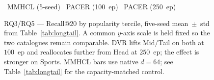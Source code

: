 \documentclass[conference]{IEEEtran}
\newcommand{\dvr}{DVR\xspace}
\begin{document}
\begin{figure}[!htbp]
\vspace{0.4mm}
{\scriptsize
{}~MMHCL (5-seed)\quad
{}~PACER (100~ep)\quad
{}~PACER (250~ep)}
\caption{RQ3/RQ5 --- Recall@20 by popularity tercile, five-seed
mean~$\pm$~std from Table~\ref{tab:longtail}.
A common $y$-axis scale is held fixed so the two catalogues remain comparable.
\dvr lifts Mid/Tail on both at $100$~ep and reallocates further from Head
at $250$~ep; the effect is stronger on Sports. MMHCL bars use native
$d{=}64$; see Table~\ref{tab:longtail} for the capacity-matched control.}
\label{fig:tercile}
\end{figure}
\end{document}
